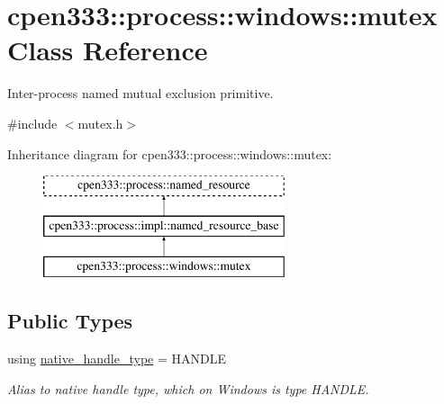 \hypertarget{classcpen333_1_1process_1_1windows_1_1mutex}{}\section{cpen333\+:\+:process\+:\+:windows\+:\+:mutex Class Reference}
\label{classcpen333_1_1process_1_1windows_1_1mutex}


Inter-\/process named mutual exclusion primitive.  




{\ttfamily \#include $<$mutex.\+h$>$}

Inheritance diagram for cpen333\+:\+:process\+:\+:windows\+:\+:mutex\+:\begin{figure}[H]
\begin{center}
\leavevmode
\includegraphics[height=3.000000cm]{classcpen333_1_1process_1_1windows_1_1mutex}
\end{center}
\end{figure}
\subsection*{Public Types}
\begin{DoxyCompactItemize}
\item 
\mbox{\label{classcpen333_1_1process_1_1windows_1_1mutex_a6e4acfaa842ca9c60333a33ea613806b}} 
using \hyperlink{classcpen333_1_1process_1_1windows_1_1mutex_a6e4acfaa842ca9c60333a33ea613806b}{native\+\_\+handle\+\_\+type} = H\+A\+N\+D\+LE
\begin{DoxyCompactList}\small\item\em Alias to native handle type, which on Windows is type H\+A\+N\+D\+LE. \end{DoxyCompactList}\end{DoxyCompactItemize}
